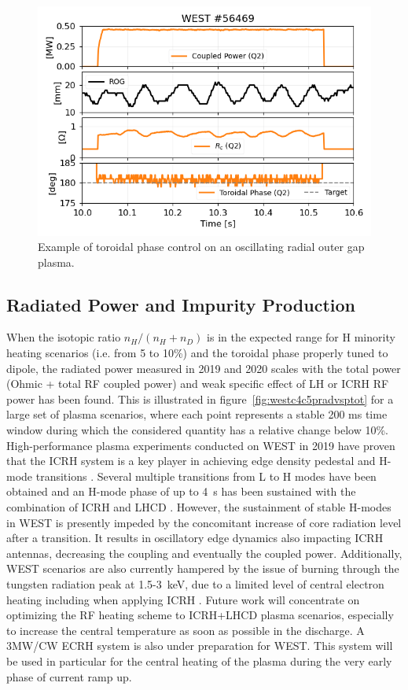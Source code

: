 \documentclass[12p]{iopart}
\begin{document}
\begin{figure}
	\centering
	\includegraphics[width=0.95\linewidth]{figures/WEST_IC_56469_Phase_Control}
	\caption{Example of toroidal phase control on an oscillating radial outer gap plasma.}
	\label{fig:westic56469phasecontrol}
\end{figure}

\subsection{Radiated Power and Impurity Production}
When the isotopic ratio $n_H/(n_H+n_D)$ is in the expected range for H minority heating scenarios (i.e. from 5 to 10\%) and the toroidal phase properly tuned to dipole, the radiated power measured in 2019 and 2020 scales with the total power (Ohmic + total RF coupled power) and weak specific effect of LH or ICRH RF power has been found. This is illustrated in figure~\ref{fig:westc4c5pradvsptot} for a large set of plasma scenarios, where each point represents a stable 200 ms time window during which the considered quantity has a relative change below 10\%. High-performance plasma experiments conducted on WEST in 2019 have proven that the ICRH system is a key player in achieving edge density pedestal and H-mode transitions \cite{goniche2021,vermare2021}. Several multiple transitions from L to H modes have been obtained and an H-mode phase of up to \SI{4}{\second} has been sustained with the combination of ICRH and LHCD \cite{bucalossi2021}. However, the sustainment of stable H-modes in WEST is presently impeded by the concomitant increase of core radiation level after a transition. It results in oscillatory edge dynamics also impacting ICRH antennas, decreasing the coupling and eventually the coupled power. Additionally, WEST scenarios are also currently hampered by the issue of burning through the tungsten radiation peak at 1.5-\SI{3}{\kilo\electronvolt}, due to a limited level of central electron heating including when applying ICRH \cite{goniche2021}. Future work will concentrate on optimizing the RF heating scheme to ICRH+LHCD plasma scenarios, especially to increase the central temperature as soon as possible in the discharge. A 3MW/CW ECRH system is also under preparation for WEST\cite{bucalossi2021}. This system will be used in particular for the central heating of the plasma during the very early phase of current ramp up.
\end{document}
